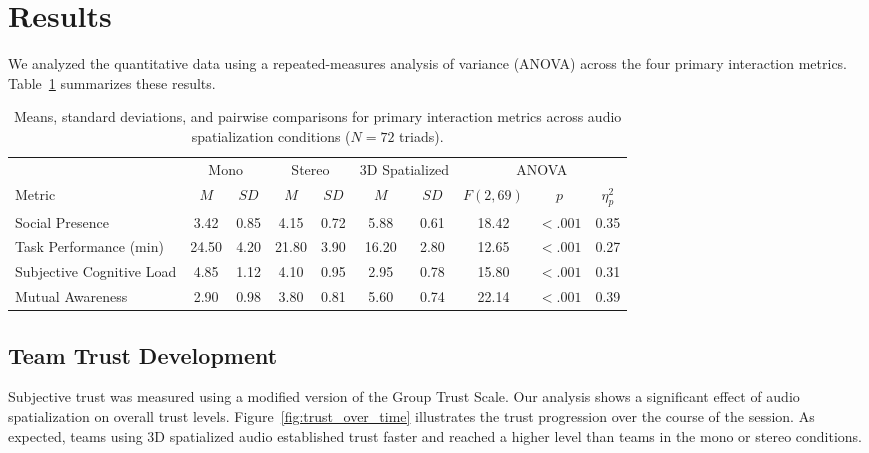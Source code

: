 \section{Results}
We analyzed the quantitative data using a repeated-measures analysis of variance (ANOVA) across the four primary interaction metrics. Table~\ref{tab:results} summarizes these results.

\begin{table}[t]
\centering
\caption{Means, standard deviations, and pairwise comparisons for primary interaction metrics across audio spatialization conditions ($N=72$ triads).}
\label{tab:results}
\begin{tabular}{lccccccccc}
\toprule
& \multicolumn{2}{c}{Mono} & \multicolumn{2}{c}{Stereo} & \multicolumn{2}{c}{3D Spatialized} & \multicolumn{3}{c}{ANOVA} \\
\cmidrule(r){2-3} \cmidrule(r){4-5} \cmidrule(r){6-7} \cmidrule(r){8-10}
Metric & $M$ & $SD$ & $M$ & $SD$ & $M$ & $SD$ & $F(2, 69)$ & $p$ & $\eta_p^2$ \\
\midrule
Social Presence & 3.42 & 0.85 & 4.15 & 0.72 & 5.88 & 0.61 & 18.42 & $< .001$ & 0.35 \\{}
Task Performance (min) & 24.50 & 4.20  & 21.80 & 3.90  & 16.20 & 2.80  & 12.65 & $< .001$ & 0.27 \\{}
Subjective Cognitive Load & 4.85 & 1.12 & 4.10 & 0.95 & 2.95 & 0.78 & 15.80 & $< .001$ & 0.31 \\{}
Mutual Awareness & 2.90 & 0.98 & 3.80 & 0.81 & 5.60 & 0.74 & 22.14 & $< .001$ & 0.39 \\
\bottomrule
\end{tabular}
\end{table}

\subsection{Team Trust Development}
Subjective trust was measured using a modified version of the Group Trust Scale. Our analysis shows a significant effect of audio spatialization on overall trust levels. Figure~\ref{fig:trust_over_time} illustrates the trust progression over the course of the session. As expected, teams using 3D spatialized audio established trust faster and reached a higher level than teams in the mono or stereo conditions.

